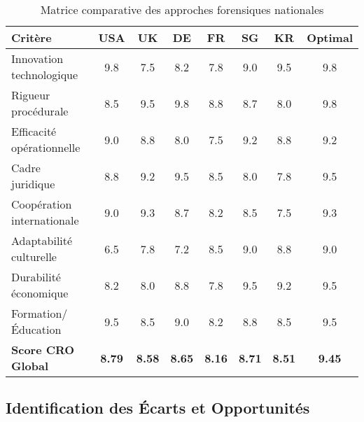 \begin{table}[h]
\centering
\scriptsize
\begin{tabular}{|l|c|c|c|c|c|c|c|}
\hline
\textbf{Critère} & \textbf{USA} & \textbf{UK} & \textbf{DE} & \textbf{FR} & \textbf{SG} & \textbf{KR} & \textbf{Optimal} \\
\hline
Innovation technologique & 9.8 & 7.5 & 8.2 & 7.8 & 9.0 & 9.5 & 9.8 \\
Rigueur procédurale & 8.5 & 9.5 & 9.8 & 8.8 & 8.7 & 8.0 & 9.8 \\
Efficacité opérationnelle & 9.0 & 8.8 & 8.0 & 7.5 & 9.2 & 8.8 & 9.2 \\
Cadre juridique & 8.8 & 9.2 & 9.5 & 8.5 & 8.0 & 7.8 & 9.5 \\
Coopération internationale & 9.0 & 9.3 & 8.7 & 8.2 & 8.5 & 7.5 & 9.3 \\
Adaptabilité culturelle & 6.5 & 7.8 & 7.2 & 8.5 & 9.0 & 8.8 & 9.0 \\
Durabilité économique & 8.2 & 8.0 & 8.8 & 7.8 & 9.5 & 9.2 & 9.5 \\
Formation/Éducation & 9.5 & 8.5 & 9.0 & 8.2 & 8.8 & 8.5 & 9.5 \\
\hline
\textbf{Score CRO Global} & \textbf{8.79} & \textbf{8.58} & \textbf{8.65} & \textbf{8.16} & \textbf{8.71} & \textbf{8.51} & \textbf{9.45} \\
\hline
\end{tabular}
\caption{Matrice comparative des approches forensiques nationales}
\end{table}

\subsection{Identification des Écarts et Opportunités}

